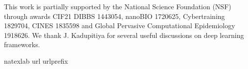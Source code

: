 \documentclass[12pt]{article}
\theoremstyle{definition}
\renewcommand{\_}{%
    \textunderscore\hspace{0pt}%
}
\begin{document}
\vskip 14pt

This work is partially supported by the National Science Foundation
(NSF) through awards CIF21 DIBBS 1443054, nanoBIO 1720625,
Cybertraining 1829704, CINES 1835598 and Global Pervasive
Computational Epidemiology 1918626.  We thank J. Kadupitiya for
several useful discussions on deep learning frameworks.

\par



%
%


\fontsize{11}{1em}\selectfont
\renewcommand\bibname{\bfseries{\fontsize{14pt}{1em}\selectfont References}}
\expandafter\ifx\csname
natexlab\endcsname\relax\def\natexlab#1{#1}\fi
\expandafter\ifx\csname url\endcsname\relax
  \def\url#1{\texttt{#1}}\fi
\expandafter\ifx\csname urlprefix\endcsname\relax\def\urlprefix{URL}\fi


%
%




\end{document}
